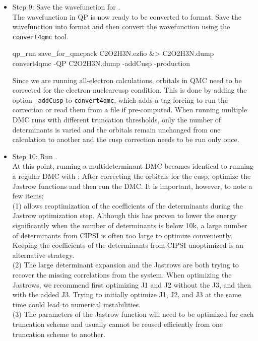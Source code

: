 \begin{itemize}
\item Step 9: Save the wavefunction for \qmcpack. \\
The wavefunction in QP is now ready to be converted to \qmcpack format.
Save the wavefunction into \qmcpack format and then convert the wavefunction using the \texttt{convert4qmc} tool.\\

\begin{shade}
qp_run save_for_qmcpack C2O2H3N.ezfio &> C2O2H3N.dump  
convert4qmc -QP C2O2H3N.dump -addCusp -production
\end{shade}

Since we are running all-electron calculations, orbitals in QMC need
to be corrected for the electron-nuclearcusp condition.  This is done
by adding the option \texttt{-addCusp} to \texttt{convert4qmc}, which
adds a tag forcing \qmcpack to run the correction or read them from a
file if pre-computed. When running multiple DMC runs with different
truncation thresholds, only the number of determinants is varied and
the orbitals remain unchanged from one calculation to another and the
cusp correction needs to be run only once.

\item Step 10: Run \qmcpack. \\
At this point, running a multideterminant DMC becomes identical to running a regular DMC with \qmcpack; 
After correcting the orbitals for the cusp, optimize the Jastrow functions and then run the DMC. It is important, however, to note a few items:\\

(1) \qmcpack allows reoptimization of the coefficients of the
determinants during the Jastrow optimization step. Although this has
proven to lower the energy significantly when the number of
determinants is below 10k, a large number of determinants from CIPSI
is often too large to optimize conveniently. Keeping the coefficients
of the determinants from CIPSI unoptimized is an alternative strategy.\\

(2) The large determinant expansion and the Jastrows are both trying
to recover the missing correlations from the system. When optimizing
the Jastrows, we recommend first optimizing J1 and J2 without the J3,
and then with the added J3. Trying to initially optimize J1, J2, and J3
at the same time could lead to numerical instabilities.\\

(3) The parameters of the Jastrow function will need to be optimized
for each truncation scheme and usually cannot be reused efficiently
from one truncation scheme to another.\\


\end{itemize}
